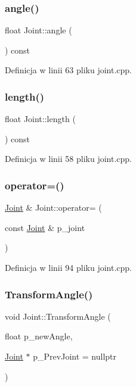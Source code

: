 \subsubsection{\texorpdfstring{angle()}{angle()}}
{\footnotesize\ttfamily float Joint\+::angle (\begin{DoxyParamCaption}{ }\end{DoxyParamCaption}) const}



Definicja w linii 63 pliku joint.\+cpp.

\mbox{\label{class_joint_acf30d550f5ca1e0e5eb60dafdc83d202}} 
\subsubsection{\texorpdfstring{length()}{length()}}
{\footnotesize\ttfamily float Joint\+::length (\begin{DoxyParamCaption}{ }\end{DoxyParamCaption}) const}



Definicja w linii 58 pliku joint.\+cpp.

\mbox{\label{class_joint_a3cd9a9a2dc9226b2588c6ddab9659bed}} 
\subsubsection{\texorpdfstring{operator=()}{operator=()}}
{\footnotesize\ttfamily \hyperlink{class_joint}{Joint} \& Joint\+::operator= (\begin{DoxyParamCaption}\item[{const \hyperlink{class_joint}{Joint} \&}]{p\+\_\+joint }\end{DoxyParamCaption})}



Definicja w linii 94 pliku joint.\+cpp.

\mbox{\label{class_joint_ad2529cc3d781c18ead369c0ea42b700b}} 
\subsubsection{\texorpdfstring{Transform\+Angle()}{TransformAngle()}}
{\footnotesize\ttfamily void Joint\+::\+Transform\+Angle (\begin{DoxyParamCaption}\item[{float}]{p\+\_\+new\+Angle,  }\item[{\hyperlink{class_joint}{Joint} $\ast$}]{p\+\_\+\+Prev\+Joint = {\ttfamily nullptr} }\end{DoxyParamCaption})}



